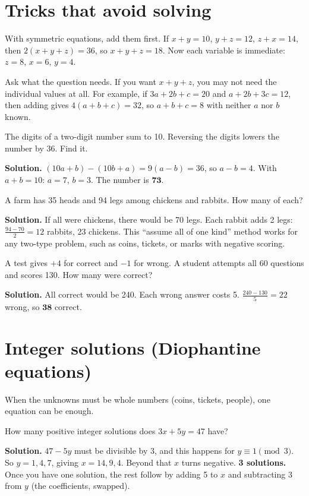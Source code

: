 \documentclass[11pt,a4paper,openany]{report}
\begin{document}
\section{Tricks that avoid solving}
\begin{idea}
With symmetric equations, add them first. If $x+y=10$, $y+z=12$, $z+x=14$, then $2(x+y+z)=36$, so $x+y+z=18$. Now each variable is immediate: $z=8$, $x=6$, $y=4$.

Ask what the question needs. If you want $x+y+z$, you may not need the individual values at all. For example, if $3a+2b+c=20$ and $a+2b+3c=12$, then adding gives $4(a+b+c)=32$, so $a+b+c=8$ with neither $a$ nor $b$ known.
\end{idea}

\begin{example}[digits]
The digits of a two-digit number sum to 10. Reversing the digits lowers the number by 36. Find it.

\textbf{Solution.} $(10a+b)-(10b+a)=9(a-b)=36$, so $a-b=4$. With $a+b=10$: $a=7$, $b=3$. The number is $\mathbf{73}$.
\end{example}

\begin{example}
A farm has 35 heads and 94 legs among chickens and rabbits. How many of each?

\textbf{Solution.} If all were chickens, there would be 70 legs. Each rabbit adds 2 legs: $\frac{94-70}2=12$ rabbits, 23 chickens. This ``assume all of one kind'' method works for any two-type problem, such as coins, tickets, or marks with negative scoring.
\end{example}

\begin{example}
A test gives $+4$ for correct and $-1$ for wrong. A student attempts all 60 questions and scores 130. How many were correct?

\textbf{Solution.} All correct would be 240. Each wrong answer costs 5. $\frac{240-130}5=22$ wrong, so $\mathbf{38}$ correct.
\end{example}

\section{Integer solutions (Diophantine equations)}
When the unknowns must be whole numbers (coins, tickets, people), one equation can be enough.
\begin{example}
How many positive integer solutions does $3x+5y=47$ have?

\textbf{Solution.} $47-5y$ must be divisible by 3, and this happens for $y\equiv1\pmod3$. So $y=1,4,7$, giving $x=14,9,4$. Beyond that $x$ turns negative. \textbf{3 solutions.} Once you have one solution, the rest follow by adding 5 to $x$ and subtracting 3 from $y$ (the coefficients, swapped).
\end{example}
\end{document}
